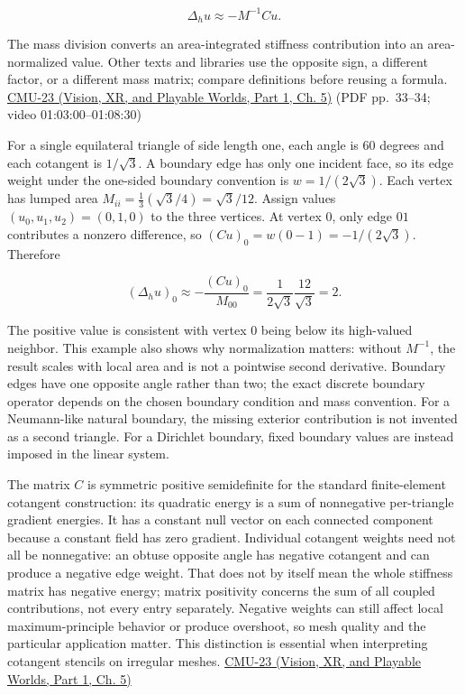 \[
\Delta_hu\approx -M^{-1}Cu.
\]

The mass division converts an area-integrated stiffness contribution into an area-normalized value. Other texts and libraries use the opposite sign, a different factor, or a different mass matrix; compare definitions before reusing a formula. \href{../07-Vision-XR-and-Playable-Worlds-P01/main.pdf\#nameddest=04-visual-computing-ii-ch036-cmu-23---physically-based-animation-and-pdes}{CMU-23 (Vision, XR, and Playable Worlds, Part 1, Ch. 5)} (PDF pp.~33--34; video 01:03:00--01:08:30)

For a single equilateral triangle of side length one, each angle is \(60\) degrees and each cotangent is \(1/\sqrt{3}\). A boundary edge has only one incident face, so its edge weight under the one-sided boundary convention is \(w=1/(2\sqrt3)\). Each vertex has lumped area \(M_{ii}=\frac13(\sqrt3/4)=\sqrt3/12\). Assign values \((u_0,u_1,u_2)=(0,1,0)\) to the three vertices. At vertex 0, only edge \(01\) contributes a nonzero difference, so \((Cu)_0=w(0-1)=-1/(2\sqrt3)\). Therefore

\[
(\Delta_hu)_0\approx-\frac{(Cu)_0}{M_{00}}
=\frac{1}{2\sqrt3}\frac{12}{\sqrt3}=2.
\]

The positive value is consistent with vertex 0 being below its high-valued neighbor. This example also shows why normalization matters: without \(M^{-1}\), the result scales with local area and is not a pointwise second derivative. Boundary edges have one opposite angle rather than two; the exact discrete boundary operator depends on the chosen boundary condition and mass convention. For a Neumann-like natural boundary, the missing exterior contribution is not invented as a second triangle. For a Dirichlet boundary, fixed boundary values are instead imposed in the linear system.

The matrix \(C\) is symmetric positive semidefinite for the standard finite-element cotangent construction: its quadratic energy is a sum of nonnegative per-triangle gradient energies. It has a constant null vector on each connected component because a constant field has zero gradient. Individual cotangent weights need not all be nonnegative: an obtuse opposite angle has negative cotangent and can produce a negative edge weight. That does not by itself mean the whole stiffness matrix has negative energy; matrix positivity concerns the sum of all coupled contributions, not every entry separately. Negative weights can still affect local maximum-principle behavior or produce overshoot, so mesh quality and the particular application matter. This distinction is essential when interpreting cotangent stencils on irregular meshes. \href{../07-Vision-XR-and-Playable-Worlds-P01/main.pdf\#nameddest=04-visual-computing-ii-ch036-cmu-23---physically-based-animation-and-pdes}{CMU-23 (Vision, XR, and Playable Worlds, Part 1, Ch. 5)}

